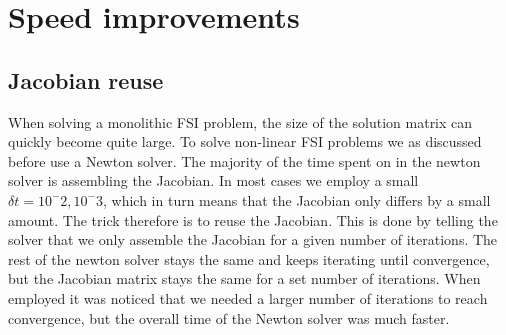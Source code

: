 \chapter{Speed improvements}
\section{Jacobian reuse}
When solving a monolithic FSI problem, the size of the solution matrix can quickly become quite large. To solve non-linear FSI problems we as discussed before use a Newton solver. The majority of the time spent on in the newton solver is assembling the Jacobian. In most cases we employ a small $\delta t = 10^-2, 10^-3$, which in turn means that the Jacobian only differs by a small amount. The trick therefore is to reuse the Jacobian. This is done by telling the solver that we only assemble the Jacobian for a given number of iterations. The rest of the newton solver stays the same and keeps iterating until convergence, but the Jacobian matrix stays the same for a set number of iterations. When employed it was noticed that we needed a larger number of iterations to reach convergence, but the overall time of the Newton solver was much faster.